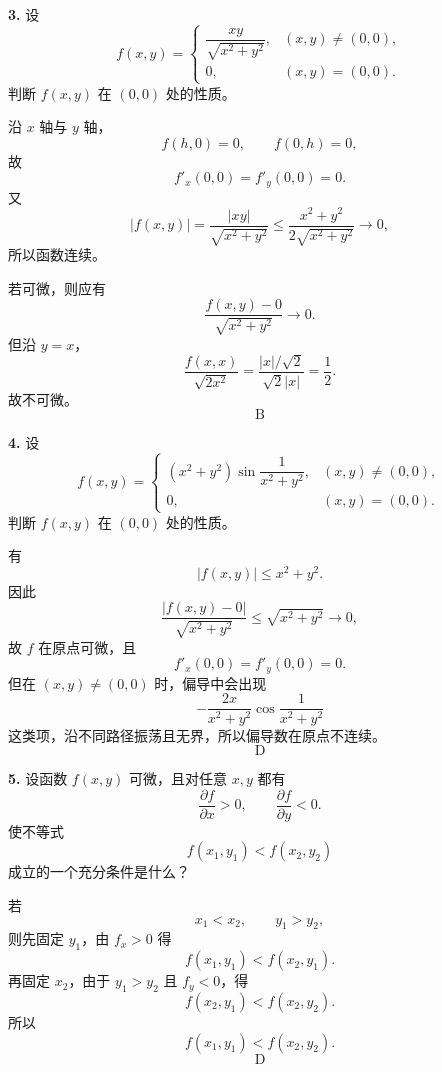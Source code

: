 \begin{problemblock}
\textbf{3.} 设
\[
f(x,y)=
\begin{cases}
\dfrac{xy}{\sqrt{x^2+y^2}},&(x,y)\ne(0,0),\\
0,&(x,y)=(0,0).
\end{cases}
\]
判断 \(f(x,y)\) 在 \((0,0)\) 处的性质。
\end{problemblock}

\begin{solutionblock}
沿 \(x\) 轴与 \(y\) 轴，
\[
f(h,0)=0,\qquad f(0,h)=0,
\]
故
\[
f'_x(0,0)=f'_y(0,0)=0.
\]
又
\[
|f(x,y)|=\frac{|xy|}{\sqrt{x^2+y^2}}\le \frac{x^2+y^2}{2\sqrt{x^2+y^2}}\to0,
\]
所以函数连续。

若可微，则应有
\[
\frac{f(x,y)-0}{\sqrt{x^2+y^2}}\to0.
\]
但沿 \(y=x\)，
\[
\frac{f(x,x)}{\sqrt{2x^2}}
=\frac{|x|/\sqrt2}{\sqrt2|x|}
=\frac12.
\]
故不可微。
\[
\boxed{\text{B}}
\]
\end{solutionblock}

\begin{problemblock}
\textbf{4.} 设
\[
f(x,y)=
\begin{cases}
(x^2+y^2)\sin\dfrac1{x^2+y^2},&(x,y)\ne(0,0),\\
0,&(x,y)=(0,0).
\end{cases}
\]
判断 \(f(x,y)\) 在 \((0,0)\) 处的性质。
\end{problemblock}

\begin{solutionblock}
有
\[
|f(x,y)|\le x^2+y^2.
\]
因此
\[
\frac{|f(x,y)-0|}{\sqrt{x^2+y^2}}\le \sqrt{x^2+y^2}\to0,
\]
故 \(f\) 在原点可微，且
\[
f'_x(0,0)=f'_y(0,0)=0.
\]
但在 \((x,y)\ne(0,0)\) 时，偏导中会出现
\[
-\frac{2x}{x^2+y^2}\cos\frac1{x^2+y^2}
\]
这类项，沿不同路径振荡且无界，所以偏导数在原点不连续。
\[
\boxed{\text{D}}
\]
\end{solutionblock}

\begin{problemblock}
\textbf{5.} 设函数 \(f(x,y)\) 可微，且对任意 \(x,y\) 都有
\[
\frac{\partial f}{\partial x}>0,\qquad \frac{\partial f}{\partial y}<0.
\]
使不等式
\[
f(x_1,y_1)<f(x_2,y_2)
\]
成立的一个充分条件是什么？
\end{problemblock}

\begin{solutionblock}
若
\[
x_1<x_2,\qquad y_1>y_2,
\]
则先固定 \(y_1\)，由 \(f_x>0\) 得
\[
f(x_1,y_1)<f(x_2,y_1).
\]
再固定 \(x_2\)，由于 \(y_1>y_2\) 且 \(f_y<0\)，得
\[
f(x_2,y_1)<f(x_2,y_2).
\]
所以
\[
f(x_1,y_1)<f(x_2,y_2).
\]
\[
\boxed{\text{D}}
\]
\end{solutionblock}


